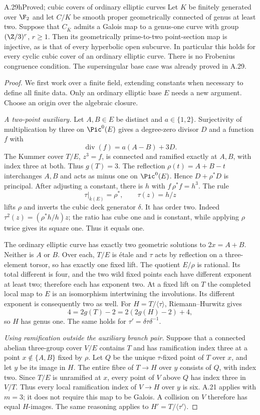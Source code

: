 \begin{claim}{A.29h}{Proved; cubic covers of ordinary elliptic curves}
Let $K$ be finitely generated over $\F_2$ and let $C/K$
be smooth proper geometrically connected of genus at least
two. Suppose that $C_{\overline K}$ admits a Galois map
to a genus-one curve with group $(\Z/3)^r$, $r\ge1$.
Then its geometrically prime-to-two point-section map is
injective, as is that of every hyperbolic open subcurve.
In particular this holds for every cyclic cubic cover of
an ordinary elliptic curve. There is no Frobenius
congruence condition. The supersingular base case was
already proved in A.29.
\end{claim}
\begin{proof}
We first work over a finite field, extending constants
when necessary to define all finite data. Only an
ordinary elliptic base $E$ needs a new argument. Choose
an origin over the algebraic closure.

\emph{A two-point auxiliary.}
Let $A,B\in E$ be distinct and $a\in\{1,2\}$.
Surjectivity of multiplication by three on $\Pic^0(E)$
gives a degree-zero divisor $D$ and a function $f$ with
\[
 \operatorname{div}(f)=a(A-B)+3D.
\]
The Kummer cover $T/E$, $z^3=f$, is connected and ramified
exactly at $A,B$, with index three at both. Thus $g(T)=3$.
The reflection $\rho(t)=A+B-t$ interchanges $A,B$ and acts
as minus one on $\Pic^0(E)$. Hence $D+\rho^*D$ is principal.
After adjusting a constant, there is $h$ with
$f\,\rho^*f=h^3$. The rule
\[
 \tau|_{\overline k(E)}=\rho^*,\qquad \tau(z)=h/z
\]
lifts $\rho$ and inverts the cubic deck generator $\delta$.
It has order two. Indeed $\tau^2(z)=(\rho^*h/h)z$;
the ratio has cube one and is constant, while applying
$\rho$ twice gives its square one. Thus it equals one.

The ordinary elliptic curve has exactly two geometric
solutions to $2x=A+B$. Neither is $A$ or $B$.
Over each, $T/E$ is \'{e}tale and $\tau$ acts by reflection
on a three-element torsor, so has exactly one fixed lift.
The quotient $E/\rho$ is rational. Its total different
is four, and the two wild fixed points each have different
exponent at least two; therefore each has exponent two.
At a fixed lift on $T$ the completed local map to $E$ is
an isomorphism intertwining the involutions. Its different
exponent is consequently two as well. For
$H=T/\langle\tau\rangle$, Riemann--Hurwitz gives
\[
 4=2g(T)-2=2(2g(H)-2)+4,
\]
so $H$ has genus one. The same holds for
$\tau'=\delta\tau\delta^{-1}$.

\emph{Using ramification outside the auxiliary branch pair.}
Suppose that a connected abelian three-group cover $V/E$
contains $T$ and has ramification index three at a point
$x\notin\{A,B\}$ fixed by $\rho$. Let $Q$ be the unique
$\tau$-fixed point of $T$ over $x$, and let $y$ be its
image in $H$. The entire fibre of $T\to H$ over $y$
consists of $Q$, with index two. Since $T/E$ is unramified
at $x$, every point of $V$ above $Q$ has index three in
$V/T$. Thus every local ramification index of $V\to H$
over $y$ is six. A.21 applies with $m=3$; it does not
require this map to be Galois. A collision on $V$ therefore
has equal $H$-images. The same reasoning applies to
$H'=T/\langle\tau'\rangle$.


\end{proof}
